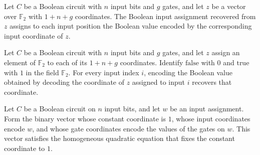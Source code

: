 \begin{definition}
\label{FABL.BooleanCircuit.circuitQuadraticInput}
\leanok
{}
Let $C$ be a Boolean circuit with $n$ input bits and $g$ gates, and let $z$ be a vector
over $\mathbb{F}_2$ with $1+n+g$ coordinates. The Boolean input assignment recovered
from $z$ assigns to each input position the Boolean value encoded by the corresponding
input coordinate of $z$.
\end{definition}

\begin{theorem}
\leanok
{}
Let $C$ be a Boolean circuit with $n$ input bits and $g$ gates, and let $z$ assign an
element of $\mathbb{F}_2$ to each of its $1+n+g$ coordinates. Identify $\text{false}$ with $0$
and $\text{true}$ with $1$ in the field $\mathbb{F}_2$. For every input index $i$, encoding the
Boolean value obtained by decoding the coordinate of $z$ assigned to input $i$ recovers
that coordinate.
\end{theorem}

\begin{theorem}
\label{FABL.BooleanCircuit.circuitQuadraticConstantEquation_witness}
\leanok
{}
Let $C$ be a Boolean circuit on $n$ input bits, and let $w$ be an input assignment. Form
the binary vector whose constant coordinate is $1$, whose input coordinates encode $w$,
and whose gate coordinates encode the values of the gates on $w$. This vector satisfies
the homogeneous quadratic equation that fixes the constant coordinate to $1$.
\end{theorem}

